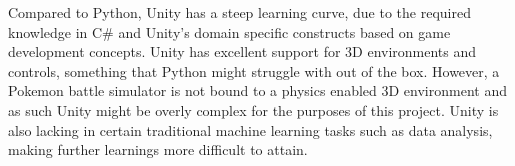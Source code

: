 Compared to Python, Unity has a steep learning curve,
due to the required knowledge in C\# and Unity's domain specific constructs based on game development concepts. Unity has excellent support for 3D environments and controls,
something that Python might struggle with out of the box. However, a Pokemon battle simulator is not bound to a physics enabled 3D environment and as such
Unity might be overly complex for the purposes of this project.
Unity is also lacking in certain traditional machine learning tasks such as data analysis, making further learnings more difficult to attain.  
